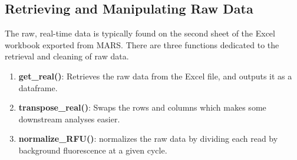 \documentclass[preprint,12pt, a4paper]{elsarticle}
\begin{document}
    \subsection{Retrieving and Manipulating Raw Data}
        The raw, real-time data is typically found on the second sheet of the Excel workbook exported from MARS. There are three functions dedicated to the retrieval and cleaning of raw data.

    \begin{enumerate}
        \item \textbf{get\_real()}: Retrieves the raw data from the Excel file, and outputs it as a dataframe.
        \item \textbf{transpose\_real()}: Swaps the rows and columns which makes some downstream analyses easier.
        \item \textbf{normalize\_RFU()}: normalizes the raw data by dividing each read by background fluorescence at a given cycle.
    \end{enumerate}


\end{document}
